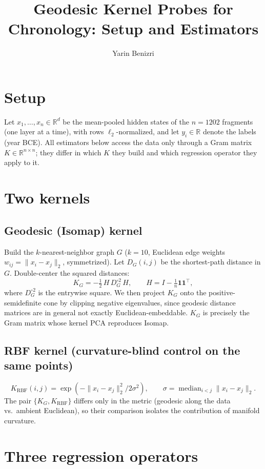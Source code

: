 \documentclass[11pt]{article}
\title{Geodesic Kernel Probes for Chronology: Setup and Estimators}
\author{Yarin Benizri}
\date{}
\begin{document}
\maketitle

\section{Setup}
Let $x_{1},\dots,x_{n}\in\mathbb{R}^{d}$ be the mean-pooled hidden states of the
$n=1202$ fragments (one layer at a time), with rows $\ell_{2}$-normalized, and let
$y_{i}\in\mathbb{R}$ denote the labels (year BCE). All estimators below access the
data only through a Gram matrix $K\in\mathbb{R}^{n\times n}$; they differ in which
$K$ they build and which regression operator they apply to it.

\section{Two kernels}
\subsection{Geodesic (Isomap) kernel}
Build the $k$-nearest-neighbor graph $G$ ($k=10$, Euclidean edge weights
$w_{ij}=\lVert x_{i}-x_{j}\rVert_{2}$, symmetrized). Let $D_{G}(i,j)$ be the
shortest-path distance in $G$. Double-center the squared distances:
\[
K_{G}=-\tfrac{1}{2}\,H\,D_{G}^{\circ2}\,H,\qquad H=I-\tfrac{1}{n}\mathbf{1}\mathbf{1}^{\top},
\]
where $D_{G}^{\circ2}$ is the entrywise square. We then project $K_{G}$ onto the
positive-semidefinite cone by clipping negative eigenvalues, since geodesic
distance matrices are in general not exactly Euclidean-embeddable. $K_{G}$ is
precisely the Gram matrix whose kernel PCA reproduces Isomap.

\subsection{RBF kernel (curvature-blind control on the same points)}
\[
K_{\mathrm{RBF}}(i,j)=\exp\!\left(-\lVert x_{i}-x_{j}\rVert_{2}^{2}/2\sigma^{2}\right),
\qquad \sigma=\operatorname{median}_{i<j}\lVert x_{i}-x_{j}\rVert_{2}.
\]
The pair $\{K_{G},K_{\mathrm{RBF}}\}$ differs only in the metric (geodesic along
the data vs.\ ambient Euclidean), so their comparison isolates the contribution
of manifold curvature.

\section{Three regression operators}
\end{document}
